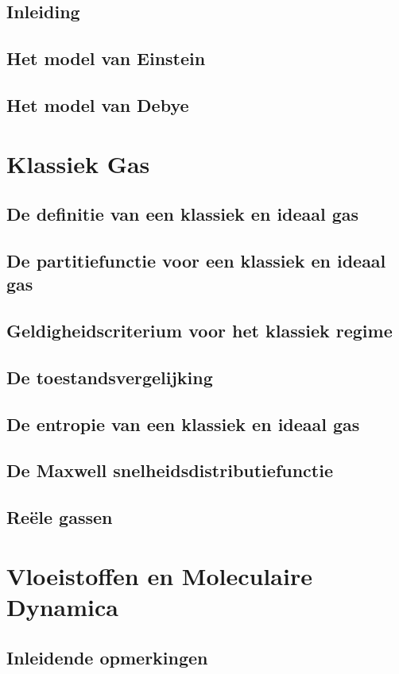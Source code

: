 \documentclass[a4paper,twoside]{article}
\theoremstyle{definition}
\theoremstyle{plain}
\begin{document}
\subsection{Inleiding}
\subsection{Het model van Einstein}
\subsection{Het model van Debye}

\section{Klassiek Gas}
\subsection{De definitie van een klassiek en ideaal gas}
\subsection{De partitiefunctie voor een klassiek en ideaal gas}
\subsection{Geldigheidscriterium voor het klassiek regime}
\subsection{De toestandsvergelijking}
\subsection{De entropie van een klassiek en ideaal gas}
\subsection{De Maxwell snelheidsdistributiefunctie}
\subsection{Re\"ele gassen}

\section{Vloeistoffen en Moleculaire Dynamica}
\subsection{Inleidende opmerkingen}
\end{document}
